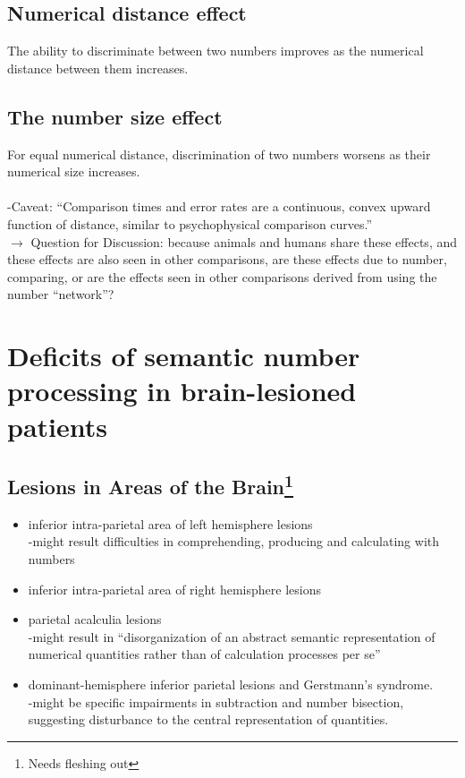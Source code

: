 \documentclass[12pt]{article}
\begin{document}
\subsection*{Numerical distance effect}
The ability to discriminate
between two numbers improves as the numerical distance between them increases.

\subsection*{The number size effect}
For equal numerical distance, discrimination of
two numbers worsens as their numerical size increases.\\~\\
-Caveat: ``Comparison times and error rates are a continuous,
convex upward function of distance, similar to psychophysical
comparison curves.''\\
$\rightarrow$ 
Question for Discussion: because animals and humans share these effects, and these effects are also seen in other comparisons, are these effects due to number, comparing, or are the effects seen in other comparisons derived from using the number ``network''?

\section{Deficits of semantic number processing in
brain-lesioned patients}

\subsection*{Lesions in Areas of the Brain\footnote{Needs fleshing out}}
\begin{itemize}
\item inferior intra-parietal area of left hemisphere lesions\\
-might result difficulties in comprehending, producing and calculating with numbers
\item inferior intra-parietal area of right hemisphere lesions
\item parietal acalculia lesions\\
-might result in ``disorganization of an abstract
semantic representation of numerical quantities rather than of calculation processes per se''
\item dominant-hemisphere inferior parietal
lesions and Gerstmann’s syndrome.\\
-might be specific impairments in subtraction and number
bisection, suggesting disturbance to the central
representation of quantities.
\end{itemize}
\end{document}
